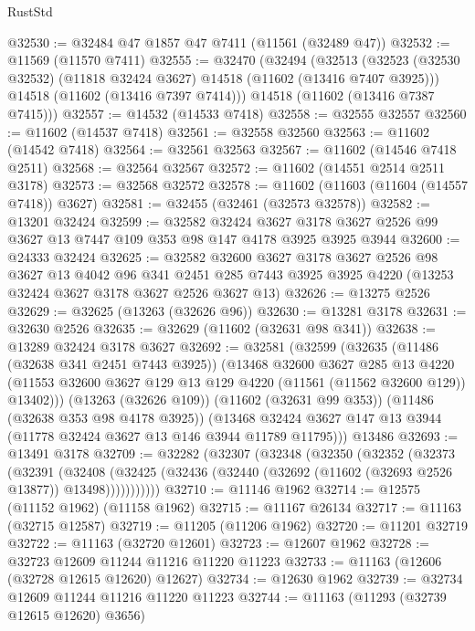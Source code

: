 \begin{lexlean}{RustStd}
\begin{coremodule}
@32530 := @32484 @47 @1857 @47 @7411 (@11561 (@32489 @47))
@32532 := @11569 (@11570 @7411)
@32555 := @32470
    (@32494
      (@32513
        (@32523 (@32530 @32532) (@11818 @32424 @3627) @14518 (@11602 (@13416 @7407 @3925)))
        @14518
        (@11602 (@13416 @7397 @7414)))
      @14518
      (@11602 (@13416 @7387 @7415)))
@32557 := @14532 (@14533 @7418)
@32558 := @32555 @32557
@32560 := @11602 (@14537 @7418)
@32561 := @32558 @32560
@32563 := @11602 (@14542 @7418)
@32564 := @32561 @32563
@32567 := @11602 (@14546 @7418 @2511)
@32568 := @32564 @32567
@32572 := @11602 (@14551 @2514 @2511 @3178)
@32573 := @32568 @32572
@32578 := @11602 (@11603 (@11604 (@14557 @7418)) @3627)
@32581 := @32455 (@32461 (@32573 @32578))
@32582 := @13201 @32424
@32599 := @32582
    @32424
    @3627
    @3178
    @3627
    @2526
    @99
    @3627
    @13
    @7447
    @109
    @353
    @98
    @147
    @4178
    @3925
    @3925
    @3944
@32600 := @24333 @32424
@32625 := @32582
    @32600
    @3627
    @3178
    @3627
    @2526
    @98
    @3627
    @13
    @4042
    @96
    @341
    @2451
    @285
    @7443
    @3925
    @3925
    @4220
    (@13253 @32424 @3627 @3178 @3627 @2526 @3627 @13)
@32626 := @13275 @2526
@32629 := @32625 (@13263 (@32626 @96))
@32630 := @13281 @3178
@32631 := @32630 @2526
@32635 := @32629 (@11602 (@32631 @98 @341))
@32638 := @13289 @32424 @3178 @3627
@32692 := @32581
    (@32599
      (@32635
        (@11486 (@32638 @341 @2451 @7443 @3925))
        (@13468
          @32600
          @3627
          @285
          @13
          @4220
          (@11553 @32600 @3627 @129 @13 @129 @4220 (@11561 (@11562 @32600 @129)) @13402)))
      (@13263 (@32626 @109))
      (@11602 (@32631 @99 @353))
      (@11486 (@32638 @353 @98 @4178 @3925))
      (@13468 @32424 @3627 @147 @13 @3944 (@11778 @32424 @3627 @13 @146 @3944 @11789 @11795)))
    @13486
@32693 := @13491 @3178
@32709 := @32282
    (@32307
      (@32348
        (@32350
          (@32352
            (@32373
              (@32391
                (@32408
                  (@32425 (@32436 (@32440 (@32692 (@11602 (@32693 @2526 @13877)) @13498)))))))))))
@32710 := @11146 @1962
@32714 := @12575 (@11152 @1962) (@11158 @1962)
@32715 := @11167 @26134
@32717 := @11163 (@32715 @12587)
@32719 := @11205 (@11206 @1962)
@32720 := @11201 @32719
@32722 := @11163 (@32720 @12601)
@32723 := @12607 @1962
@32728 := @32723 @12609 @11244 @11216 @11220 @11223
@32733 := @11163 (@12606 (@32728 @12615 @12620) @12627)
@32734 := @12630 @1962
@32739 := @32734 @12609 @11244 @11216 @11220 @11223
@32744 := @11163 (@11293 (@32739 @12615 @12620) @3656)

\end{coremodule}
\end{lexlean}
